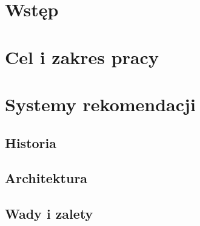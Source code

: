 \documentclass[a4paper,12pt,oneside]{book} %
\begin{document}
\sloppy
\thispagestyle{empty}

\newpage{}

\thispagestyle{empty}
\newpage{}

\tableofcontents{}

\chapter*{Wstęp}
\label{Wstep}
\lipsum[1]

\chapter*{Cel i zakres pracy}
\label{Cel i zakres pracy}
\lipsum[1]

\chapter{Systemy rekomendacji}
\lipsum[1]\cite{test1}

\section{Historia}
\lipsum[1]\cite{test2}

\lipsum[1]\cite{test2}

\lipsum[1]\cite{test2}


\section{Architektura}
\lipsum[1]\cite{test4}

\section{Wady i zalety}
\lipsum[1]\cite{test5}
\end{document}
